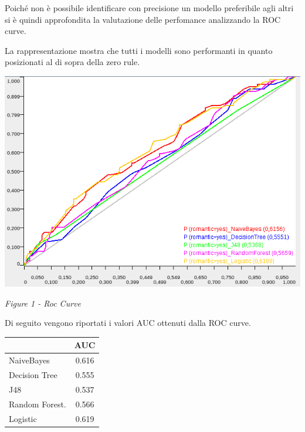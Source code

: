 \documentclass[12pt,a4paper]{report}
\begin{document}
\begin{multicols}{2}
Poiché non è possibile identificare con precisione un modello preferibile agli altri si è quindi approfondita la valutazione delle perfomance analizzando la ROC curve. 

La rappresentazione mostra che tutti i modelli sono performanti in quanto posizionati al di sopra della zero rule.

\newcommand\myfigure[1]{%
	\medskip\noindent\begin{minipage}{\columnwidth}
		\centering%
		#1%
	\end{minipage}\medskip}

\myfigure{\includegraphics[width=1.02\linewidth]{RocCurve}}


\begin{center}
	\textit{Figure 1 - Roc Curve}
\end{center}

Di seguito vengono riportati i valori  AUC ottenuti dalla ROC curve. 

\begin{center}
	\begin{tabular}{|>{\centering\arraybackslash}m{3cm}|c|}
		\hline
		& AUC  \\
		\hline
		NaiveBayes & 0.616	\\
		\hline
		Decision Tree & 0.555   \\
		\hline
		J48 & 0.537  \\
		\hline
		Random Forest. & 0.566 \\
		\hline
		Logistic & 0.619 \\
		\hline
	\end{tabular}
\end{center}


\end{multicols}
\end{document}
